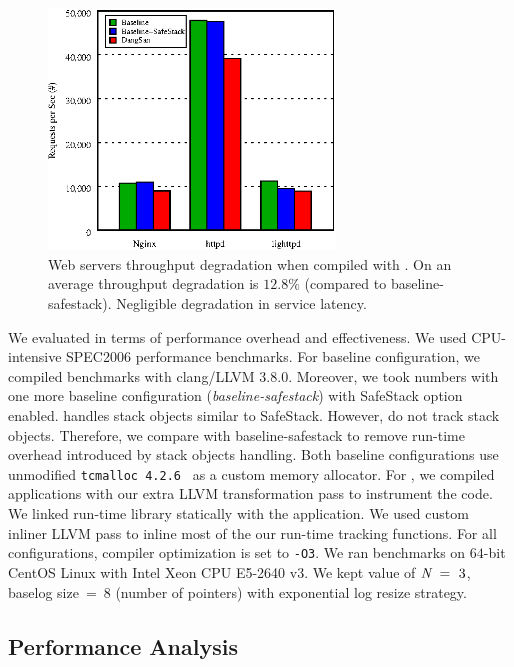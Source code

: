 \begin{figure}[t]
\center
  \includegraphics[width=3in]{plots/server_perf.eps}
  \caption{Web servers throughput degradation when compiled with \projectname{}. On an average throughput degradation is $12.8\%$ (compared to baseline-safestack). Negligible degradation in service latency.}
 \label{fig:server_perf}
  \vspace{-1em}
\end{figure} 

We evaluated \projectname{} in terms of performance overhead and effectiveness. We used CPU-intensive SPEC2006 performance benchmarks. For baseline configuration, we compiled benchmarks with clang/LLVM $3.8.0$. Moreover, we took numbers with one more baseline configuration (\emph{baseline-safestack}) with SafeStack option enabled. \metalloc{} handles stack objects similar to SafeStack. However, \projectname{} do not track stack objects. Therefore, we compare \projectname{} with baseline-safestack to remove run-time overhead introduced by stack objects handling. Both baseline configurations use unmodified \texttt{tcmalloc 4.2.6}~\cite{ghemawat2009tcmalloc} as a custom memory allocator. For \projectname{}, we compiled applications with our extra LLVM transformation pass to instrument the code. We linked \projectname{} run-time library statically with the application. We used custom inliner LLVM pass to inline most of the our run-time tracking functions. For all configurations, compiler optimization is set to \texttt{-O3}. We ran benchmarks on $64$-bit CentOS Linux with Intel Xeon CPU E5-2640 v3. We kept value of $\emph{N}\ =\ 3$, baselog size$\ =\ 8$ (number of pointers) with exponential log resize strategy.

\subsection{Performance Analysis} 

